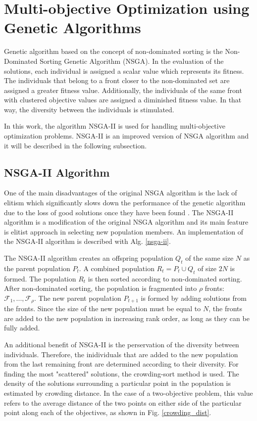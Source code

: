 \section{Multi-objective Optimization using Genetic Algorithms}
Genetic algorithm based on the concept of non-dominated sorting is the Non-Dominated Sorting Genetic Algorithm (NSGA). 
In the evaluation of the solutions, each individual is assigned a scalar value which represents its fitness. 
The individuals that belong to a front closer to the non-dominated set are assigned a greater fitness value. Additionally, the individuals of the same front with clustered objective values are assigned a diminished fitness value. 
In that way, the diversity between the individuals is stimulated. 

In this work, the algorithm NSGA-II is used for handling multi-objective optimization problems. 
NSGA-II is an improved version of NSGA algorithm and it will be described in the following subsection. 

\subsection{NSGA-II Algorithm}
One of the main disadvantages of the original NSGA algorithm is the lack of elitism which significantly slows down the performance of the genetic algorithm due to the loss of good solutions once they have been found \cite{deb2000fast}. 
The NSGA-II algorithm is a modification of the original NSGA algorithm and its main feature is elitist approach in selecting new population members. 
An implementation of the NSGA-II algorithm is described with Alg. \ref{nsga-ii}.

The NSGA-II algorithm creates an offspring population $Q_t$ of the same size $N$ as the parent population $P_t$.
A combined population $R_t = P_t \cup Q_t$ of size $2N$ is formed.
The population $R_t$ is then sorted according to non-dominated sorting. 
After non-dominated sorting, the population is fragmented into $\rho$ fronts: $\mathcal{F}_1, ..., \mathcal{F}_\rho$.
The new parent population $P_{t+1}$ is formed by adding solutions from the fronts.
Since the size of the new population must be equal to $N$, the fronts are added to the new population in increasing rank order, as long as they can be fully added.

An additional benefit of NSGA-II is the perservation of the diversity between individuals. 
Therefore, the inidividuals that are added to the new population from the last remaining front are determined according to their diversity. 
For finding the most "scattered" solutions, the crowding-sort method is used. 
The density of the solutions surrounding a particular point in the population is estimated by crowding distance. 
In the case of a two-objective problem, this value refers to the average distance of the two points on either side of the particular point along each of the objectives, as shown in Fig. 
\ref{crowding_dist}. 

